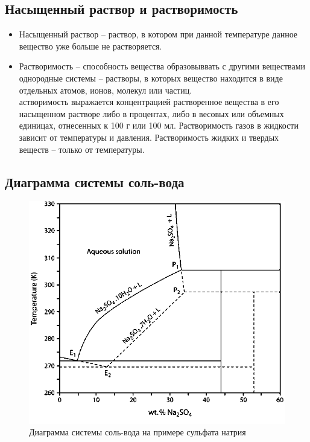 \documentclass[14pt,a4paper]{scrartcl}
\begin{document}
\subsection*{Насыщенный раствор и растворимость}
\begin{itemize}
	\item Насыщенный раствор -- раствор, в котором при данной температуре данное вещество уже больше не растворяется.
	\item Растворимость -- способность вещества образовыввать с другими веществами однородные системы – растворы, в которых вещество находится в виде отдельных атомов, ионов, молекул или частиц. \\
	астворимость выражается концентрацией растворенное вещества в его насыщенном растворе либо в процентах, либо в весовых или объемных единицах, отнесенных к 100 г или 100 мл. Растворимость газов в жидкости зависит от температуры и давления.  Растворимость жидких и твердых веществ – только от температуры.
\end{itemize}

\subsection*{Диаграмма системы соль-вода}
\begin{figure}[htp]
\centering
\includegraphics[scale=1.5]{h2o-diagram.png}
\caption{Диаграмма системы соль-вода на примере сульфата натрия}
\label{}
\end{figure}
\end{document}
